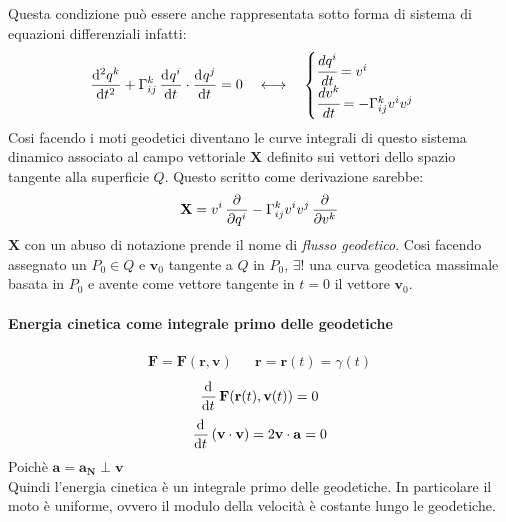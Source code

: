 Questa condizione può essere anche rappresentata sotto forma di sistema di equazioni differenziali infatti:
\[
    \dod[2]{q^k}{t}+\Gamma^k_{ij}\dod{q^i}{t}\cdot \dod{q^j}{t}=0
    \quad\longleftrightarrow\quad
    \begin{cases}
        \cfrac{dq^i}{dt}=v^i\\
        \cfrac{dv^k}{dt}=-\Gamma^k_{ij}v^iv^j
    \end{cases}
\]
Cosi facendo i moti geodetici diventano le curve integrali di questo sistema dinamico associato al campo vettoriale $\mathbf{X}$ definito sui vettori dello spazio tangente alla superficie $Q$. Questo scritto come derivazione sarebbe:
\begin{align*}
    \mathbf{X}=v^i\dpd{}{{q^i}}-\Gamma^k_{ij}v^iv^j\dpd{}{{v^k}}
\end{align*}
$\mathbf{X}$ con un abuso di notazione prende il nome di \emph{flusso geodetico}.
Cosi facendo assegnato un $P_0\in Q$ e $\mathbf{v}_0$ tangente a $Q$ in $P_0$, $\exists!$ una curva geodetica massimale basata in $P_0$ e avente come vettore tangente in $t=0$ il vettore $\mathbf{v}_0$.
\paragraph*{Energia cinetica come integrale primo delle geodetiche}
\begin{align*}
    \mathbf{F}=\mathbf{F}(\mathbf{r},\mathbf{v}) && \mathbf{r}=\mathbf{r}(t)=\gamma(t)
\end{align*}
\begin{align*}
    \dod{}{t}\mathbf{F}(\mathbf{r}(t),\mathbf{v}(t))=0
\end{align*}
\begin{align*}
    \dod{}{t}(\mathbf{v}\cdot \mathbf{v})=2\mathbf{v}\cdot\mathbf{a}=0
\end{align*}
Poichè $\mathbf{a}=\mathbf{a}_{\mathbf{N}}\perp \mathbf{v}$\\
Quindi l'energia cinetica è un integrale primo delle geodetiche. In particolare il moto è uniforme, ovvero il modulo della velocità è costante lungo le geodetiche.